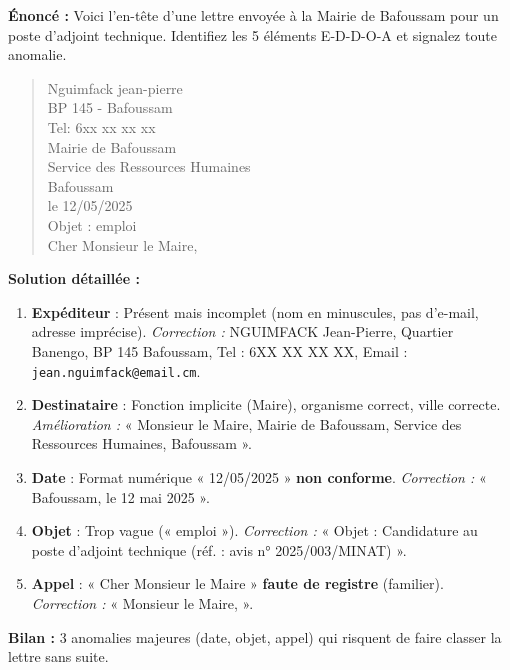 \documentclass[11pt]{article}
\begin{document}
\begin{exoresolu}
\textbf{Énoncé :} Voici l'en-tête d'une lettre envoyée à la Mairie de Bafoussam pour un poste d'adjoint technique. Identifiez les 5 éléments E-D-D-O-A et signalez toute anomalie.

\begin{quote}
Nguimfack jean-pierre \\
BP 145 - Bafoussam \\
Tel: 6xx xx xx xx \\

Mairie de Bafoussam \\
Service des Ressources Humaines \\
Bafoussam \\

le 12/05/2025 \\

Objet : emploi \\

Cher Monsieur le Maire,
\end{quote}

\textbf{Solution détaillée :}
\begin{enumerate}
\item \textbf{Expéditeur} : Présent mais incomplet (nom en minuscules, pas d'e-mail, adresse imprécise). \textit{Correction :} NGUIMFACK Jean-Pierre, Quartier Banengo, BP 145 Bafoussam, Tel : 6XX XX XX XX, Email : \texttt{jean.nguimfack@email.cm}.
\item \textbf{Destinataire} : Fonction implicite (Maire), organisme correct, ville correcte. \textit{Amélioration :} « Monsieur le Maire, Mairie de Bafoussam, Service des Ressources Humaines, Bafoussam ».
\item \textbf{Date} : Format numérique « 12/05/2025 » \textbf{non conforme}. \textit{Correction :} « Bafoussam, le 12 mai 2025 ».
\item \textbf{Objet} : Trop vague (« emploi »). \textit{Correction :} « Objet : Candidature au poste d'adjoint technique (réf. : avis n° 2025/003/MINAT) ».
\item \textbf{Appel} : « Cher Monsieur le Maire » \textbf{faute de registre} (familier). \textit{Correction :} « Monsieur le Maire, ».
\end{enumerate}
\textbf{Bilan :} 3 anomalies majeures (date, objet, appel) qui risquent de faire classer la lettre sans suite.
\end{exoresolu}
\end{document}
